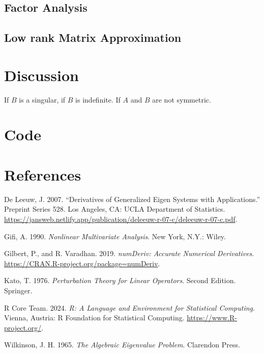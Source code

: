 \documentclass[
  12pt,
  letterpaper,
  DIV=11,
  numbers=noendperiod]{scrartcl}
\newlength{\cslhangindent}
\newenvironment{CSLReferences}[2] %
 {\begin{list}{}{%
  \setlength{\itemindent}{0pt}
  \setlength{\leftmargin}{0pt}
  \setlength{\parsep}{0pt}
  \ifodd #1
   \setlength{\leftmargin}{\cslhangindent}
   \setlength{\itemindent}{-1\cslhangindent}
  \fi
  \setlength{\itemsep}{#2\baselineskip}}}
 {\end{list}}
\begin{document}
\subsection{Factor Analysis}\label{sec-fa}

\subsection{Low rank Matrix Approximation}\label{sec-rank}

\section{Discussion}\label{sec-discussion}

If \(B\) is a singular, if \(B\) is indefinite. If \(A\) and \(B\) are
not symmetric.

\section{Code}\label{sec-code}

\section*{References}\label{sec-references}

\label{refs}
\begin{CSLReferences}{1}{0}
De Leeuw, J. 2007. {``Derivatives of Generalized Eigen Systems with
Applications.''} Preprint Series 528. Los Angeles, CA: UCLA Department
of Statistics.
\url{https://jansweb.netlify.app/publication/deleeuw-r-07-c/deleeuw-r-07-c.pdf}.

Gifi, A. 1990. \emph{Nonlinear Multivariate Analysis}. New York, N.Y.:
Wiley.

Gilbert, P., and R. Varadhan. 2019. \emph{{numDeriv: Accurate Numerical
Derivatives}}. \url{https://CRAN.R-project.org/package=numDeriv}.

Kato, T. 1976. \emph{Perturbation Theory for Linear Operators}. Second
Edition. Springer.

R Core Team. 2024. \emph{R: A Language and Environment for Statistical
Computing}. {Vienna, Austria}: R Foundation for Statistical Computing.
\url{https://www.R-project.org/}.

Wilkinson, J. H. 1965. \emph{{The Algebraic Eigenvalue Problem}}.
Clarendon Press.

\end{CSLReferences}
\end{document}
